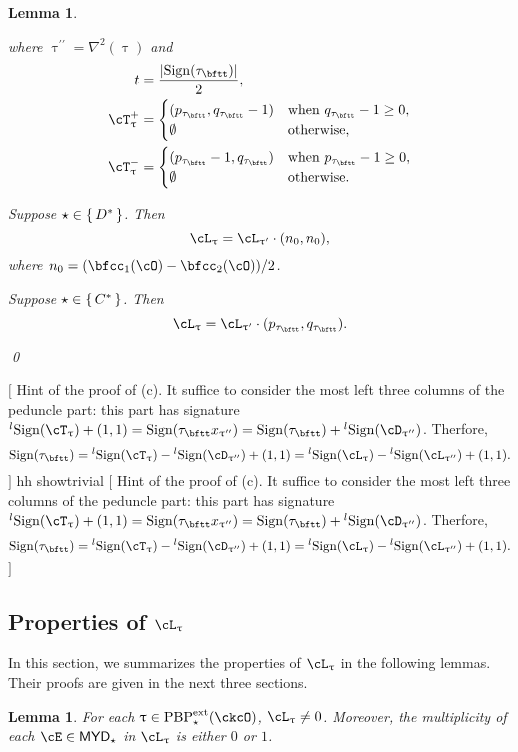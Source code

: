 \documentclass[12pt,a4paper]{amsart}
\newcommand{\trivial}[2][]{\if\relax\detokenize{#1}\relax
  {%
      \color{orange} \vspace{0em} $[$  #2 $]$
      \color{black}
  }
  \else
\ifx#1h
\ifcsname showtrivial\endcsname
{%
    \color{orange} \vspace{0em}  $[$ #2 $]$
    \color{black}
}
\fi
\else {\red Wrong argument!} \fi
\fi
}
\def\MYD{{\mathsf{MYD}}}
\def\abs#1{\left|{#1}\right|}
\def\DD{\nabla}
\numberwithin{equation}{section}
\newtheorem{lem}[thm]{Lemma}
\theoremstyle{remark}
\def\lsign{{}^l\mathrm{Sign}}
\def\ssign{\mathrm{Sign}}
\def\PBPes{\mathrm{PBP}^{\mathrm{ext}}_{\star}}
\def\uptaupp{\uptau^{\prime\prime}}
\begin{document}
\begin{lem}
\begin{enuma}
\begin{equation}
  \end{equation}
  where $\uptaupp = \DD^{2}(\uptau)$ and
  \[
  \begin{split}
    t &  = \frac{\abs{\ssign(\tau_{\bftt})}}{2},\\
    \pcT_{\uptau}& = \begin{cases} (p_{\tau_{\bftt}},q_{\tau_{\bftt}}-1) & \text{when
      } q_{\tau_{\bftt}}-1\geq 0 , \\
      \emptyset & \text{otherwise},
    \end{cases}\\
    \ncT_{\uptau}& = \begin{cases} (p_{\tau_{\bftt}}-1,q_{\tau_{\bftt}}) & \text{when
      } p_{\tau_{\bftt}}-1\geq 0  ,\\
      \emptyset & \text{otherwise}.
    \end{cases}\\
  \end{split}
\]
\item
  Suppose $\star\in \set{D^{*}}$.  Then
  \[
    \ac_{\uptau}=\ac_{\uptau'} \cdot (n_{0},n_{0}),
  \]
  where $n_{0} = (\bfcc_{1}(\cO)-\bfcc_{2}(\cO))/2$.
\item
  Suppose $\star\in \set{C^{*}}$.  Then
  \[
    \ac_{\uptau}=\ac_{\uptau'} \cdot (p_{\tau_{\bftt}},q_{\tau_{\bftt}}).
\]
\end{enuma}
\qed
\end{lem}



\trivial[h]{Hint of the proof of (c). It suffice to consider the most left three columns of the peduncle
  part: this part has signature
  $\lsign(\cT_{\uptau}) +(1,1) = \ssign(\tau_{\bftt}x_{\uptaupp})= \ssign(\tau_{\bftt})+\lsign(\cD_{\uptaupp})$.
  Therfore,
  \[\ssign(\tau_{\bftt}) = \lsign(\cT_{\uptau})-\lsign(\cD_{\uptaupp})
  + (1,1) = \lsign(\ac_{\uptau})-\lsign(\ac_{\uptaupp})+(1,1).
  \]
}

\subsection{Properties of $\ac_{\uptau}$}
\label{sec:ac}
In this section, we summarizes the properties of $\ac_{\uptau}$ in the following
lemmas. Their proofs are given in the next three sections.

\begin{lem}\label{lem:ac0}
  For each $\uptau\in \PBPes(\ckcO)$, $\ac_{\uptau}\neq 0$.
  Moreover, the multiplicity of each $\cE\in \MYD_{\star}$ in $\ac_{\uptau}$ is
  either $0$ or $1$.
\end{lem}
\end{document}
